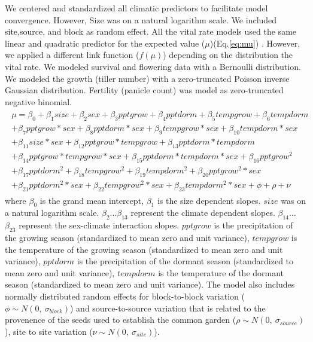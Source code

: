 \documentclass[12pt]{article}
\begin{document}
We centered and standardized all climatic predictors to facilitate model convergence.
However, Size was on a natural logarithm scale. 
We included site,source, and block as random effect.
All the vital rate models used the same linear and quadratic predictor for the expected value ($\mu$)(Eq.\ref{eq:mu}) . 
However, we applied a different link function ($f(\mu)$) depending on the distribution the vital rate. 
We modeled survival and flowering data with a Bernoulli distribution.
We modeled the growth (tiller number) with a zero-truncated Poisson inverse Gaussian distribution. 
Fertility (panicle count) was model as zero-truncated negative binomial. 
\begin{align}\label{eq:mu}
\begin{split}
\mu = \beta_{0} + \beta_{1}size + \beta_{2}sex + \beta_{3}pptgrow + \beta_{4}pptdorm + \beta_{5}tempgrow + \beta_{6}tempdorm \\ 
+ \beta_{7}pptgrow*sex + \beta_{8}pptdorm*sex + \beta_{9}tempgrow*sex + \beta_{10}tempdorm*sex  \\ 
+  \beta_{11}size*sex + \beta_{12}pptgrow*tempgrow + \beta_{13}pptdorm*tempdorm\\
+ \beta_{14}pptgrow*tempgrow*sex + \beta_{15}pptdorm*tempdorm*sex + \beta_{16}pptgrow^2\\
+ \beta_{17}pptdorm^2 + \beta_{18}tempgrow^2 + \beta_{19}tempdorm^2 + \beta_{20}pptgrow^2*sex  \\
+ \beta_{21}pptdorm^2*sex + \beta_{22}tempgrow^2*sex + \beta_{23}tempdorm^2*sex + \phi + \rho + \nu 
\end{split}
\end{align}
\noindent where $\beta_{0}$ is the  grand mean intercept, $\beta_{1}$ is the size dependent slopes.
$size$ was on a natural logarithm scale. 
$\beta_{2}$...$\beta_{13}$ represent the climate dependent slopes.
$\beta_{14}$...$\beta_{23}$ represent the sex-climate interaction slopes.
$pptgrow$ is the precipitation of the growing season (standardized to mean zero and unit variance), $tempgrow$ is the temperature of the growing season (standardized to mean zero and unit variance), $pptdorm$ is the precipitation of the dormant season (standardized to mean zero and unit variance), $tempdorm$ is the temperature of the dormant season (standardized to mean zero and unit variance).
The model also includes normally distributed random effects for block-to-block variation ($\phi \sim N(0,\ \sigma_{block})$) and source-to-source variation that is related to the provenence of the seeds used to establish the common garden ($\rho \sim N(0,\ \sigma_{source})$), site to site variation ($\nu \sim N(0,\ \sigma_{site})$).
\end{document}
